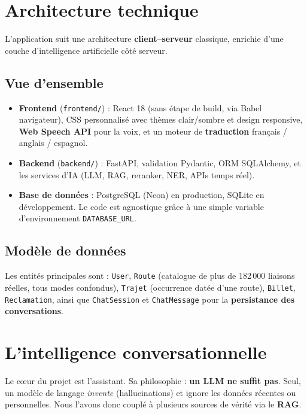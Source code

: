\documentclass[11pt,a4paper]{article}
\newcommand{\code}[1]{\texttt{\small #1}}
\begin{document}
\section{Architecture technique}

L'application suit une architecture \textbf{client--serveur} classique, enrichie d'une
couche d'intelligence artificielle côté serveur.

\subsection{Vue d'ensemble}
\begin{itemize}[nosep]
  \item \textbf{Frontend} (\code{frontend/}) : React 18 (sans étape de build, via Babel
        navigateur), CSS personnalisé avec thèmes clair/sombre et design responsive,
        \textbf{Web Speech API} pour la voix, et un moteur de \textbf{traduction}
        français / anglais / espagnol.
  \item \textbf{Backend} (\code{backend/}) : FastAPI, validation Pydantic, ORM
        SQLAlchemy, et les services d'IA (LLM, RAG, reranker, NER, APIs temps réel).
  \item \textbf{Base de données} : PostgreSQL (Neon) en production, SQLite en
        développement. Le code est agnostique grâce à une simple variable
        d'environnement \code{DATABASE\_URL}.
\end{itemize}

\subsection{Modèle de données}
Les entités principales sont : \code{User}, \code{Route} (catalogue de plus de 182\,000
liaisons réelles, tous modes confondus), \code{Trajet} (occurrence datée d'une route),
\code{Billet}, \code{Reclamation}, ainsi que \code{ChatSession} et \code{ChatMessage}
pour la \textbf{persistance des conversations}.

\section{L'intelligence conversationnelle}

Le c\oe ur du projet est l'assistant. Sa philosophie : \textbf{un LLM ne suffit pas}.
Seul, un modèle de langage \emph{invente} (hallucinations) et ignore les données
récentes ou personnelles. Nous l'avons donc couplé à plusieurs sources de vérité via
le \textbf{RAG}.
\end{document}
